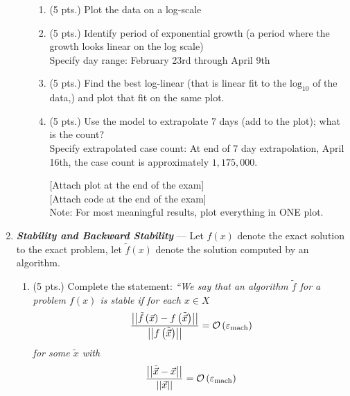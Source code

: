 \documentclass[12pt]{article}
\newcommand{\BigO}[1]{\ensuremath\mathcal{O}\left(#1\right)}
\newcommand{\gnorm}[1]{\left|\left|#1\right|\right|}
\newcommand{\parens}[1]{\left(#1\right)}
\newcommand{\vep}{\varepsilon}
\newcommand{\bfit}[1]{\textbf{\textit{#1}}}
\begin{document}
\begin{enumerate}
\begin{enumerate}
     \begin{enumerate}

     \item (5 pts.) Plot the data on a log-scale\\

     \item (5 pts.) Identify period of exponential growth (a period where the
       growth looks linear on the log scale)\\

       Specify day range: February 23rd through April 9th
       \vfill

     \item (5 pts.) Find the best log-linear (that is linear fit to the
       $\mathrm{log}_{10}$ of the data,) and plot that fit on the same plot.\\


     \item (5 pts.) Use the model to extrapolate 7 days (add to the plot);
       what is the count?\\

       Specify extrapolated case count: At end of 7 day extrapolation, April 16th, the case count is approximately $1,175,000$.
       
       [Attach plot at the end of the exam]\\[0.5em]
       [Attach code at the end of the exam]\\[0.5em]
       Note: For most meaningful results, plot everything in ONE plot.


     \end{enumerate}
     
   \end{enumerate}

   \item \bfit{Stability and Backward Stability} --- Let $f(x)$ denote
   the exact solution to the exact problem, let $\tilde{f}(x)$ denote
   the solution computed by an algorithm.

   \begin{enumerate}

     \item (5 pts.) Complete the statement: \textit{``We say that an
     algorithm $\tilde{f}$ for a problem $f(x)$ is \emph{stable} if
     for each $x\in X$}
     $$\frac{\gnorm{\tilde{f}\parens{\vec{x}} - f\parens{\tilde{\vec{x}}}}}{\gnorm{f\parens{\tilde{\vec{x}}}}} = \BigO{\vep_{\text{mach}}}$$
     \textit{for some $\tilde{x}$ with}
     $$\frac{\gnorm{\tilde{\vec{x}} - \vec{x}}}{\gnorm{\vec{x}}} = \BigO{\vep_{\text{mach}}}$$
     




\end{enumerate}
\end{enumerate}
\end{document}
